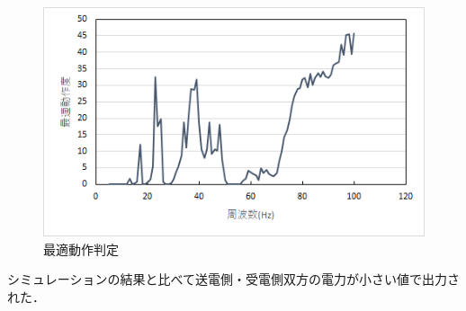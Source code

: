 \documentclass[12pt]{jarticle}
\begin{document}
\begin{figure}[H]
	\centering
	\includegraphics[]{not_nouritu_dousa.png}
	\caption{最適動作判定}
	\label{fig:not_nouritu_dousa}
\end{figure}
シミュレーションの結果と比べて送電側・受電側双方の電力が小さい値で出力された．
\end{document}

